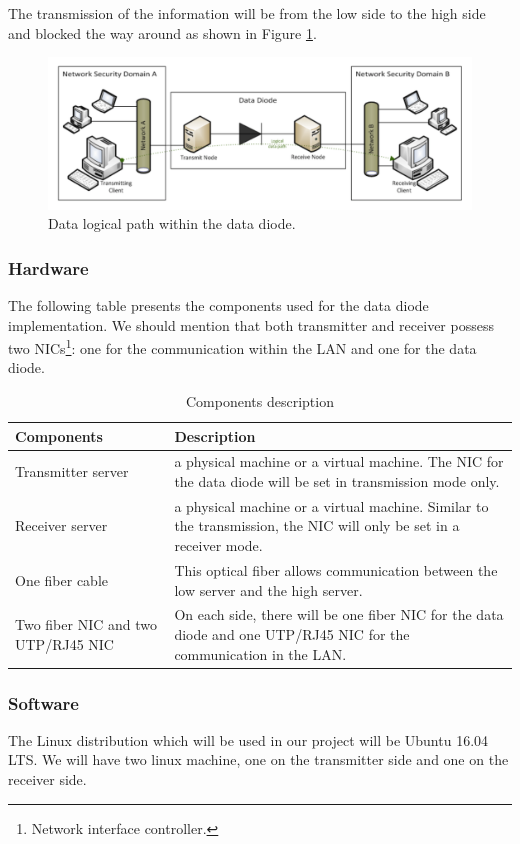 \documentclass[a4paper,10pt]{article}
\begin{document}
The transmission of the information will be from the low side to the high side and blocked the way around as shown in Figure \ref{fig:UDPDD}.

\begin{figure}
\centering
\includegraphics[scale=0.5]{images/logical-scheme-DD.png}
\caption{Data logical path within the data diode.}
\label{fig:UDPDD}
\end{figure}

\subsubsection{Hardware}
The following table presents the components used for the data diode implementation. We should mention that both transmitter and receiver possess two NICs\footnote{Network interface controller.}: one for the communication within the LAN and one for the data diode.\bigskip
\begin{table}[!h]
\centering
\begin{tabular}{|p{3cm}|p{10.5cm}|}
	\hline
	\textbf{Components} & \textbf{Description}                 \\
	\hline
	Transmitter server  &  a physical machine or a virtual machine. The NIC for the data diode will be set in transmission mode only. \\
	\hline
	Receiver server  &  a physical machine or a virtual machine. Similar to the transmission, the NIC will only be set in a receiver mode.\\
	\hline
	One fiber cable & This optical fiber allows communication between the low server and the high server.\\
	\hline
	Two fiber NIC and two UTP/RJ45 NIC & On each side, there will be one fiber NIC for the data diode and one UTP/RJ45 NIC for the communication in the LAN.  \\
	\hline
\end{tabular}
\caption{Components description}
\label{tab:component}
\end{table}
\subsubsection{Software}
The Linux distribution which will be used in our project will be Ubuntu 16.04 LTS. We will have two linux machine, one on the transmitter side and one on the receiver side. 
\end{document}
